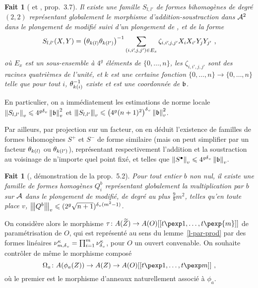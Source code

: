 \documentclass[11pt, twoside, a4paper]{article}
\newtheorem{fait}[thm]{Fait}
\theoremstyle{definition}
\begin{document}
\begin{fait}[ et , prop.~3.7]
  Il existe une famille $S_{l, l'}$ de formes bihomogènes de degré $(2, 2)$
  représentant globalement le morphisme d'addition-soustraction dans $\mathcal A^2$ dans
  le plongement de  modifié suivi d'un plongement de ,
  et de la forme
  \[
    S_{l, l'}(X, Y) = \big(\theta_{k(l)}\theta_{k(l')}\big)^{-1}
    \sum_{(i, i'\!,j, j') \in E_x}
    \zeta_{i, i'\!, j, j'} X_i X_{i'} Y_j Y_{j'} \text{ ,}
  \]
  où $E_x$ est un sous-ensemble à $4^g$ éléments de $\{0, \ldots, n \}$, les
  $\zeta_{i, i'\!, j, j'}$ sont des racines quatrièmes de l'unité, et $k$ est
  une certaine fonction $\{0, \ldots, n \} \to \{0, \ldots, n \}$ telle que pour
  tout $i$, $\theta_{k(i)}^{-1}$ existe et est une coordonnée de $\mathfrak b$.
\end{fait}

En particulier, on a immédiatement les estimations de norme locale
$\left\lVert\smash{S_{l, l'}}\right\rVert_{v} \leqslant 4^{g{\delta\smash{_v}}} \left\lVert\mathfrak b\right\rVert_{v}^2$ et $\left\lvert\hspace{-1pt}\left\lvert\hspace{-1pt} \left\lvert\smash{S_{l, l'}}\right\rvert \hspace{-1pt}\right\rvert\hspace{-1pt}\right\rvert_{v} \leqslant
\big(4^g (n+1)^2\big)^{\delta\smash{_v}} \left\lVert\mathfrak b\right\rVert_{v}^2$.

Par ailleurs, par projection sur un facteur, on en déduit l'existence de
familles de formes bihomogènes $S^+$ et $S^-$ de forme similaire (mais on peut
simplifier par un facteur $\theta_{k(l)}$ ou $\theta_{k(l')}$), représentant
respectivement l'addition et la soustraction au voisinage de n'importe quel
point fixé, et telles que $\left\lVert S^\bullet\right\rVert_{v} \leqslant 4^{g{\delta\smash{_v}}} \left\lVert\mathfrak b\right\rVert_{v}$.

\begin{fait}[, démonstration de la prop.~5.2]
  Pour tout entier $b$ non nul, il existe une famille de formes homogènes
  $Q^b_i$ représentant globalement la multiplication par $b$ sur $\mathcal A$ dans le
  plongement de  modifié, de degré au plus $\frac98 m^2$, telles
  qu'en toute place $v$, $\left\lvert\hspace{-1pt}\left\lvert\hspace{-1pt} \left\lvert Q^b\right\rvert \hspace{-1pt}\right\rvert\hspace{-1pt}\right\rvert_{v} \leqslant (2^g\sqrt{n+1})^{{\delta\smash{_v}}(m^2-1)}$.
\end{fait}

On considère alors le morphisme $\tau \colon A(\widetilde Z) \to
A(O)[[t\pexp1, \ldots, t\pexp{m}]]$ de paramétrisation de $O$, qui est \og
représenté \fg{} au sens du lemme~\ref{l-par-prod} par des formes linéaires
$\nu_{m, {\delta\smash{_v}}}^\kappa = \prod_{i=1}^m \nu_{\delta\smash{_v}}^\kappa$, pour $O$ un ouvert
convenable. On souhaite contrôler de même le morphisme composé
\[
  \Omega_a \colon A(\phi_a(Z)) \to A(Z) \to A(O)[[t\pexp1,
  \ldots, t\pexp m]] \pmm,
\]
où le premier est le morphisme d'anneaux naturellement associé à $\phi_a$.
\end{document}
